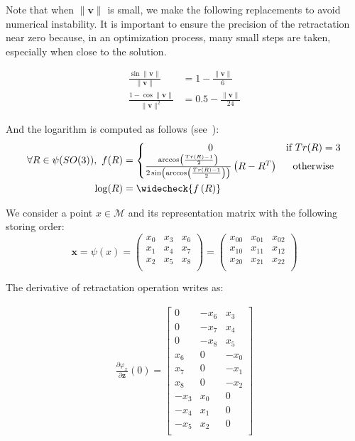 Note that when $\|\mathbf{v}\|$ is small, we make the following replacements to avoid numerical instability.
It is important to ensure the precision of the retractation near zero because, in an optimization process, many small steps are taken, especially when close to the solution.

\begin{align}
 \frac{\sin \|\mathbf{v}\|}{\|\mathbf{v}\|} & = 1-\frac{\|\mathbf{v}\|}{6}\\
 \frac{1-\cos \|\mathbf{v}\|}{\|\mathbf{v}\|^2} & = 0.5 - \frac{\|\mathbf{v}\|}{24}
\end{align}

And the logarithm is computed as follows (see~\cite{merlhiot:thesis:2009}):
\begin{align}
\begin{split}
  \forall R\in\psi(SO(3)),\ f(R) &=
  \left\{ \begin{matrix}
  0 & \text{if }Tr(R) = 3 \\
  \frac{\arccos\left(\frac{Tr(R)-1}{2}\right)}{2\sin\left(\arccos\left(\frac{Tr(R)-1}{2}\right)\right)}\left(R-R^T\right) & \text{otherwise} \\
  \end{matrix} \right.\\
  \log(R) &= \widecheck{f\left(R\right)}
\end{split}
\end{align}

We consider a point $x\in\mathcal{M}$ and its representation matrix with the following storing order:
\begin{equation}
\mathbf{x}=\psi(x)
= \begin{pmatrix}
  x_0 & x_3 & x_6 \\
  x_1 & x_4 & x_7 \\
  x_2 & x_5 & x_8 \\
\end{pmatrix}
= \begin{pmatrix}
  x_{00} & x_{01} & x_{02} \\
  x_{10} & x_{11} & x_{12} \\
  x_{20} & x_{21} & x_{22} \\
\end{pmatrix}
\end{equation}

The derivative of retractation operation writes as:

\begin{align}
\label{eq:diffRetrSO3Matrix}
  \frac{\partial \varphi_x}{\partial \mathbf{z}}(0) =
  \begin{bmatrix}
    0 & -x_6 & x_3 \\
    0 & -x_7 & x_4 \\
    0 & -x_8 & x_5 \\
    x_6 & 0 & -x_0 \\
    x_7 & 0 & -x_1 \\
    x_8 & 0 & -x_2 \\
    -x_3 & x_0 & 0 \\
    -x_4 & x_1 & 0 \\
    -x_5 & x_2 & 0 \\
  \end{bmatrix}
\end{align}

